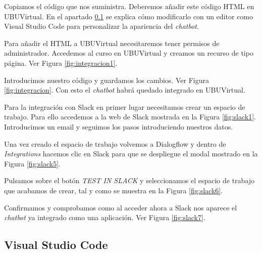 
Copiamos el código que nos suministra. Deberemos añadir este código HTML en UBUVirtual. En el apartado \ref{personalizacionHTML} se explica cómo modificarlo con un editor como Visual Studio Code para personalizar la apariencia del \textit{chatbot}.

Para añadir el HTML a UBUVirtual necesitaremos tener permisos de administrador. Accedemos al curso en UBUVirtual y creamos un recurso de tipo página. Ver Figura \ref{fig:integracion1}.


Introducimos nuestro código y guardamos los cambios. Ver Figura \ref{fig:integracion}. Con esto el \textit{chatbot} habrá quedado integrado en UBUVirtual.


Para la integración con Slack en primer lugar necesitamos crear un espacio de trabajo. Para ello accedemos a la web de Slack \cite{urlSlack} mostrada en la Figura \ref{fig:slack1}. Introducimos un email y seguimos los pasos introduciendo nuestros datos.


Una vez creado el espacio de trabajo volvemos a Dialogflow y dentro de \textit{Integrations} hacemos clic en Slack para que se despliegue el modal mostrado en la Figura \ref{fig:slack5}.


Pulsamos sobre el botón \textit{TEST IN SLACK} y seleccionamos el espacio de trabajo que acabamos de crear, tal y como se muestra en la Figura \ref{fig:slack6}.


Confirmamos y comprobamos como al acceder ahora a Slack nos aparece el \textit{chatbot} ya integrado como una aplicación. Ver Figura \ref{fig:slack7}.



\subsection{Visual Studio Code} \label{personalizacionHTML}

